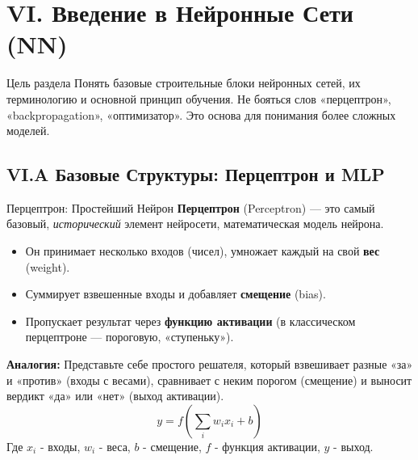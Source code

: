 
\section{VI. Введение в Нейронные Сети (NN)}

\begin{textbox}{Цель раздела}
    Понять базовые строительные блоки нейронных сетей, их терминологию и основной принцип обучения. Не бояться слов «перцептрон», «backpropagation», «оптимизатор». Это основа для понимания более сложных моделей.
\end{textbox}

\subsection{VI.A Базовые Структуры: Перцептрон и MLP}

\begin{myblock}{Перцептрон: Простейший Нейрон}
    \textbf{Перцептрон} (Perceptron) — это самый базовый, \textit{исторический} элемент нейросети, математическая модель нейрона.
    \begin{itemize}
        \item Он принимает несколько входов (чисел), умножает каждый на свой \textbf{вес} (weight).
        \item Суммирует взвешенные входы и добавляет \textbf{смещение} (bias).
        \item Пропускает результат через \textbf{функцию активации} (в классическом перцептроне — пороговую, «ступеньку»).
    \end{itemize}
    \textbf{Аналогия:} Представьте себе простого решателя, который взвешивает разные «за» и «против» (входы с весами), сравнивает с неким порогом (смещение) и выносит вердикт «да» или «нет» (выход активации).
    \[ y = f(\sum_{i} w_i x_i + b) \]
    Где $x_i$ - входы, $w_i$ - веса, $b$ - смещение, $f$ - функция активации, $y$ - выход.
\end{myblock}

